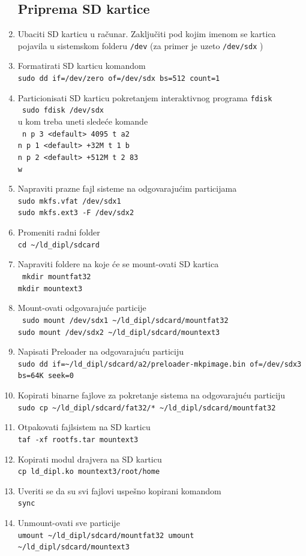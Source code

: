 \begin{enumerate}
\subsection{Priprema SD kartice}
\item Ubaciti SD karticu u računar. Zaključiti pod kojim imenom se kartica pojavila u sistemskom folderu \texttt{/dev} (za primer je uzeto \texttt{/dev/sdx} )
\item Formatirati SD karticu komandom\\
\texttt{sudo dd if=/dev/zero of=/dev/sdx bs=512 count=1}
\item Particionisati SD karticu pokretanjem interaktivnog programa \texttt{fdisk}\\
\texttt{ sudo fdisk /dev/sdx}\\
	u kom treba uneti sledeće komande\\
	\texttt{
	n p 3 <default> 4095 t a2 \\
 	n p 1 <default> +32M t 1 b \\
 	n p 2 <default> +512M t 2 83 \\
 	w \\
 	}
\item Napraviti prazne fajl sisteme na odgovarajućim particijama\\
\texttt{sudo mkfs.vfat /dev/sdx1\\
sudo mkfs.ext3 -F /dev/sdx2}
\item Promeniti radni folder\\
\texttt{cd \textasciitilde/ld\_dipl/sdcard}
\item Napraviti foldere na koje će se mount-ovati SD kartica\\
\texttt{
mkdir mountfat32\\
mkdir mountext3
}
\item Mount-ovati odgovarajuće particije\\
\texttt{
sudo mount /dev/sdx1 \textasciitilde/ld\_dipl/sdcard/mountfat32 \\
sudo mount /dev/sdx2 \textasciitilde/ld\_dipl/sdcard/mountext3
}
\item Napisati Preloader na odgovarajuću particiju\\
\texttt{sudo dd if=\textasciitilde/ld\_dipl/sdcard/a2/preloader-mkpimage.bin of=/dev/sdx3 bs=64K seek=0}
\item Kopirati binarne fajlove za pokretanje sistema na odgovarajuću particiju\\
\texttt{sudo cp \textasciitilde/ld\_dipl/sdcard/fat32/* \textasciitilde/ld\_dipl/sdcard/mountfat32} 
\item Otpakovati fajlsistem na SD karticu\\
\texttt{taf -xf rootfs.tar mountext3}
\item Kopirati modul drajvera na SD karticu\\
\texttt{cp ld\_dipl.ko mountext3/root/home}
\item Uveriti se da su svi fajlovi uspešno kopirani komandom\\
\texttt{sync}
\item Unmount-ovati sve particije\\
\texttt{umount \textasciitilde/ld\_dipl/sdcard/mountfat32
umount \textasciitilde/ld\_dipl/sdcard/mountext3}


\end{enumerate}
